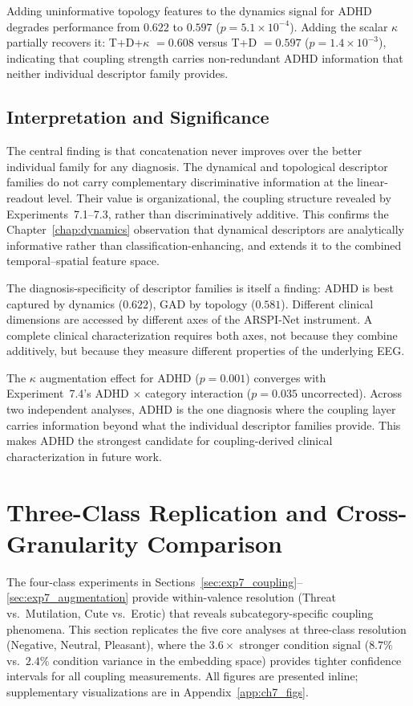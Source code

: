 Adding uninformative topology features to the dynamics signal for ADHD degrades performance from $0.622$ to $0.597$ ($p = 5.1 \times 10^{-4}$). Adding the scalar $\kappa$ partially recovers it: T+D+$\kappa$ $= 0.608$ versus T+D $= 0.597$ ($p = 1.4 \times 10^{-3}$), indicating that coupling strength carries non-redundant ADHD information that neither individual descriptor family provides.

\subsection{Interpretation and Significance}

The central finding is that concatenation never improves over the better individual family for any diagnosis. The dynamical and topological descriptor families do not carry complementary discriminative information at the linear-readout level. Their value is organizational, the coupling structure revealed by Experiments~7.1--7.3, rather than discriminatively additive. This confirms the Chapter~\ref{chap:dynamics} observation that dynamical descriptors are analytically informative rather than classification-enhancing, and extends it to the combined temporal--spatial feature space.

The diagnosis-specificity of descriptor families is itself a finding: ADHD is best captured by dynamics ($0.622$), GAD by topology ($0.581$). Different clinical dimensions are accessed by different axes of the ARSPI-Net instrument. A complete clinical characterization requires both axes, not because they combine additively, but because they measure different properties of the underlying EEG.

The $\kappa$ augmentation effect for ADHD ($p = 0.001$) converges with Experiment~7.4's ADHD $\times$ category interaction ($p = 0.035$ uncorrected). Across two independent analyses, ADHD is the one diagnosis where the coupling layer carries information beyond what the individual descriptor families provide. This makes ADHD the strongest candidate for coupling-derived clinical characterization in future work.


\section{Three-Class Replication and Cross-Granularity Comparison}
\label{sec:ch7_3class}

The four-class experiments in Sections~\ref{sec:exp7_coupling}--\ref{sec:exp7_augmentation} provide within-valence resolution (Threat vs.\ Mutilation, Cute vs.\ Erotic) that reveals subcategory-specific coupling phenomena. This section replicates the five core analyses at three-class resolution (Negative, Neutral, Pleasant), where the $3.6\times$ stronger condition signal ($8.7\%$ vs.\ $2.4\%$ condition variance in the embedding space) provides tighter confidence intervals for all coupling measurements. All figures are presented inline; supplementary visualizations are in Appendix~\ref{app:ch7_figs}.

